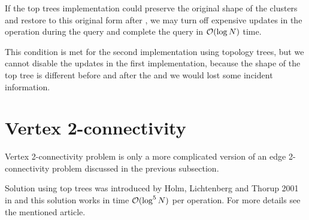 If the top trees implementation could preserve the original shape of the
clusters and restore to this original form after \Expose{}, we may turn off
expensive updates in the \Join{} operation during the query and complete the
query in ${\cal O}(\log N)$ time.

This condition is met for the second implementation using topology trees, but we
cannot disable the updates in the first implementation, because the shape of the
top tree is different before and after the \Expose{} and we would lost some
incident information.


\section{Vertex 2-connectivity}

Vertex 2-connectivity problem is only a more complicated version of an edge
2-connectivity problem discussed in the previous subsection.

Solution using top trees was introduced by Holm, Lichtenberg and Thorup 2001 in
\cite{PolylogarithmicAlgorithmsForConnectivity} and this solution works in time
${\cal O}(\log^5 N)$ per operation. For more details see the mentioned article.
